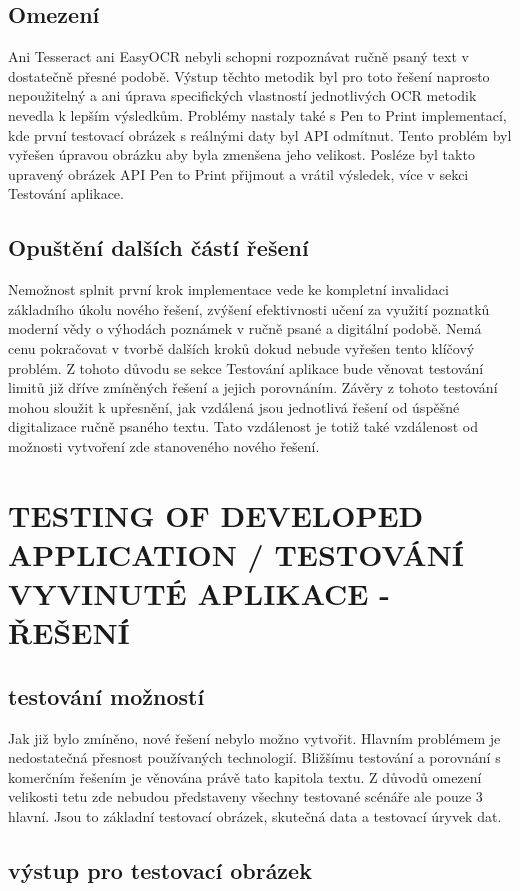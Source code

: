 \documentclass[journal]{IEEEtran}
\begin{document}
\subsection{Omezení}
Ani Tesseract ani EasyOCR nebyli schopni rozpoznávat ručně psaný text v dostatečně přesné podobě.
Výstup těchto metodik byl pro toto řešení naprosto nepoužitelný a ani úprava specifických vlastností jednotlivých \ac{OCR} metodik nevedla k lepším výsledkům.
Problémy nastaly také s Pen to Print implementací, kde první testovací obrázek s reálnými daty byl  \ac{API} odmítnut.
Tento problém byl vyřešen úpravou obrázku aby byla zmenšena jeho velikost.
Posléze byl takto upravený obrázek \ac{API} Pen to Print přijmout a vrátil výsledek, více v sekci Testování aplikace.

\subsection{Opuštění dalších částí řešení}
Nemožnost splnit první krok implementace vede ke kompletní invalidaci základního úkolu nového řešení, zvýšení efektivnosti učení za využití poznatků moderní vědy o výhodách poznámek v ručně psané a digitální podobě.
Nemá cenu pokračovat v tvorbě dalších kroků dokud nebude vyřešen tento klíčový problém.
Z tohoto důvodu se  sekce Testování aplikace bude věnovat testování limitů již dříve zmíněných řešení a jejich porovnáním.
Závěry z tohoto testování mohou sloužit k upřesnění, jak vzdálená jsou jednotlivá řešení od úspěšné digitalizace ručně psaného textu.
Tato vzdálenost je totiž také vzdálenost od možnosti vytvoření zde stanoveného nového řešení.


\section{TESTING OF DEVELOPED APPLICATION / TESTOVÁNÍ VYVINUTÉ APLIKACE - ŘEŠENÍ}

\subsection{testování možností}
Jak již bylo zmíněno, nové řešení nebylo možno vytvořit.
Hlavním problémem je nedostatečná přesnost používaných technologií.
Bližšímu testování a porovnání s komerčním řešením je věnována právě tato kapitola textu.
Z důvodů omezení velikosti tetu zde nebudou představeny všechny testované scénáře ale pouze 3 hlavní.
Jsou to základní testovací obrázek, skutečná data a testovací úryvek dat.

\subsection{výstup pro testovací obrázek}
\end{document}
